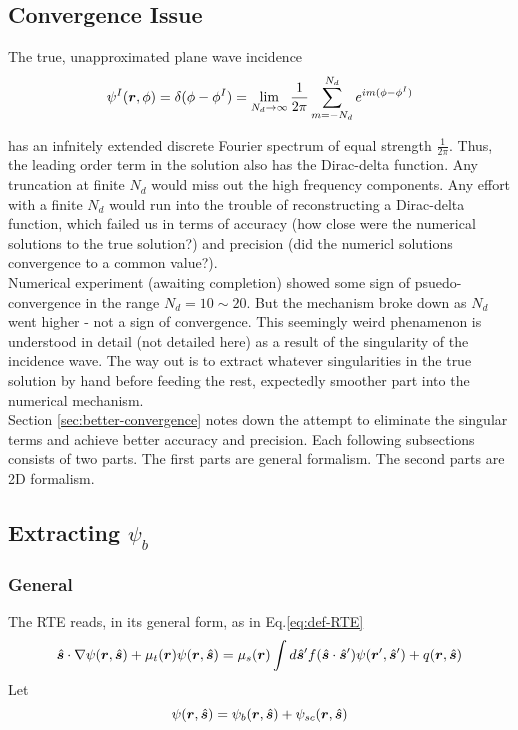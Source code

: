 \documentclass [10pt,letterpaper]{article}
\newcommand{\unitvectorsym}[1]{\hat{\vectorsym{#1}}}
\begin{document}
\subsection{Convergence Issue}
\label{sub:convergence-issue}

The true, unapproximated plane wave incidence
\begin{equation} \label{eq:harmonic-expansion-of-psiI-2d}
	\psi^I(\vectorsym{r},\phi)
	=
	\delta(\phi-\phi^I)
	=
	\lim_{N_d \to \infty}
	\frac{1}{2\pi} 
	\sum\limits_{m=-N_d}^{N_d}
	e^{i m (\phi-\phi^I)}
\end{equation}

has an infnitely extended discrete Fourier spectrum of equal strength $\frac{1}{2\pi}$.
Thus, the leading order term in the solution also has the Dirac-delta function.
Any truncation at finite $N_d$ would miss out the high frequency components.
Any effort with a finite $N_d$ would run into the trouble of reconstructing a Dirac-delta function, 
which failed us in terms of accuracy (how close were the numerical solutions to the true solution?) and precision (did the numericl solutions convergence to a common value?).
\\

Numerical experiment (awaiting completion) showed some sign of psuedo-convergence in the range $N_d=10\sim20$. 
But the mechanism broke down as $N_d$ went higher - not a sign of convergence.
This seemingly weird phenamenon is understood in detail (not detailed here) as a result of the singularity of the incidence wave.
The way out is to extract whatever singularities in the true solution by hand before feeding the rest, expectedly smoother part into the numerical mechanism.
\\

Section \eqref{sec:better-convergence} notes down the attempt to eliminate the singular terms and achieve better accuracy and precision.
Each following subsections consists of two parts.
The first parts are general formalism.
The second parts are 2D formalism.


\subsection{Extracting $\psi_b$}
\label{sub:extracting-psib}
\subsubsection{General}
\label{subsub:extracting-psib-general}
The RTE reads, in its general form, as in Eq.\eqref{eq:def-RTE}
\begin{equation*}
	\unitvectorsym{s}\cdot\nabla\psi(\vectorsym{r},\unitvectorsym{s})
	+\mu_t(\vectorsym{r})\psi(\vectorsym{r},\unitvectorsym{s})
	=
	\mu_s(\vectorsym{r})
	\int d\unitvectorsym{s}^\prime
	f(\unitvectorsym{s}\cdot\unitvectorsym{s}^\prime)
	\psi(\vectorsym{r^\prime},\unitvectorsym{s}^\prime)
	+q(\vectorsym{r},\unitvectorsym{s})
\end{equation*}
Let
\begin{equation} \label{eq:def-psi-psib-psisc-general}
	\psi(\vectorsym{r},\unitvectorsym{s})
	=
	\psi_b(\vectorsym{r},\unitvectorsym{s})
	+\psi_{sc}(\vectorsym{r},\unitvectorsym{s})
\end{equation}
\end{document}
